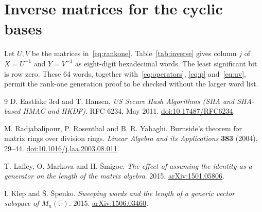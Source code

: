 \documentclass[11pt,a4paper]{article}
\theoremstyle{definition}\newtheorem{definition}[theorem]{Definition}
\begin{document}
\appendix
\section{Inverse matrices for the cyclic bases}
Let $U,V$ be the matrices in~\eqref{eq:rankone}. Table~\ref{tab:inverse}
gives column $j$ of $X=U^{-1}$ and $Y=V^{-1}$ as eight-digit hexadecimal
words. The least significant bit is row zero. These 64 words, together
with~\eqref{eq:operators}, \eqref{eq:p} and~\eqref{eq:uv}, permit the
rank-one generation proof to be checked without the larger word list.


\begin{thebibliography}{9}
D. Eastlake 3rd and T. Hansen.
\textit{US Secure Hash Algorithms (SHA and SHA-based HMAC and HKDF)}.
RFC 6234, May 2011. \href{https://doi.org/10.17487/RFC6234}{doi:10.17487/RFC6234}.

M. Radjabalipour, P. Rosenthal and B. R. Yahaghi.
Burnside's theorem for matrix rings over division rings.
\textit{Linear Algebra and its Applications} \textbf{383} (2004), 29--44.
\href{https://doi.org/10.1016/j.laa.2003.08.011}{doi:10.1016/j.laa.2003.08.011}.

T. Laffey, O. Markova and H. \v{S}migoc.
\textit{The effect of assuming the identity as a generator on the length of
the matrix algebra}. 2015.
\href{https://arxiv.org/abs/1501.05806}{arXiv:1501.05806}.

I. Klep and \v{S}. \v{S}penko.
\textit{Sweeping words and the length of a generic vector subspace of
$M_n(\mathbb F)$}. 2015.
\href{https://arxiv.org/abs/1506.03460}{arXiv:1506.03460}.
\end{thebibliography}
\end{document}
